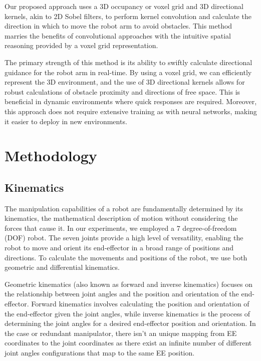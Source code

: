 \documentclass[a4paper]{article}
\begin{document}
Our proposed approach uses a 3D occupancy or voxel grid and 3D directional kernels, akin to 2D Sobel filters, to perform kernel convolution and calculate the direction in which to move the robot arm to avoid obstacles. This method marries the benefits of convolutional approaches with the intuitive spatial reasoning provided by a voxel grid representation.

The primary strength of this method is its ability to swiftly calculate directional guidance for the robot arm in real-time. By using a voxel grid, we can efficiently represent the 3D environment, and the use of 3D directional kernels allows for robust calculations of obstacle proximity and directions of free space. This is beneficial in dynamic environments where quick responses are required. Moreover, this approach does not require extensive training as with neural networks, making it easier to deploy in new environments. 

\section{Methodology }

\subsection{Kinematics}

The manipulation capabilities of a robot are fundamentally determined by its kinematics, the mathematical description of motion without considering the forces that cause it. In our experiments, we employed a 7 degree-of-freedom (DOF) robot. The seven joints provide a high level of versatility, enabling the robot to move and orient its end-effector in a broad range of positions and directions. To calculate the movements and positions of the robot, we use both geometric and differential kinematics.

Geometric kinematics (also known as forward and inverse kinematics) focuses on the relationship between joint angles and the position and orientation of the end-effector. Forward kinematics involves calculating the position and orientation of the end-effector given the joint angles, while inverse kinematics is the process of determining the joint angles for a desired end-effector position and orientation. In the case or redundant manipulator, there isn't an unique mapping from EE coordinates to the joint coordinates as there exist an infinite number of different joint angles configurations that map to the same EE position.
\end{document}

